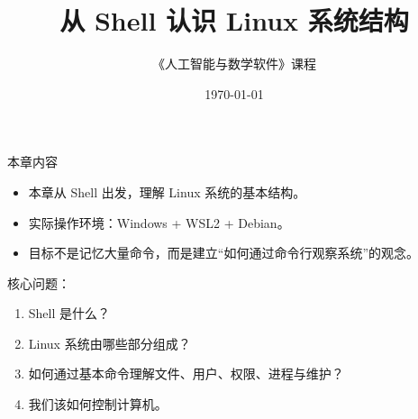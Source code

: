 \documentclass[aspectratio=169]{beamer}
\title{从 Shell 认识 Linux 系统结构}
\author{《人工智能与数学软件》课程}
\date{\today}
\begin{document}
\begin{frame}
  \titlepage
\end{frame}

\begin{frame}{本章内容}
\begin{itemize}
  \item 本章从 \alert{Shell} 出发，理解 Linux 系统的基本结构。
  \item 实际操作环境：\alert{Windows + WSL2 + Debian}。
  \item 目标不是记忆大量命令，而是建立“\alert{如何通过命令行观察系统}”的观念。
\end{itemize}

\vspace{0.5em}
核心问题：
\begin{enumerate}
  \item Shell 是什么？
  \item Linux 系统由哪些部分组成？
  \item 如何通过基本命令理解文件、用户、权限、进程与维护？
  \item \alert{我们该如何控制计算机。}
\end{enumerate}
\end{frame}


\end{document}
